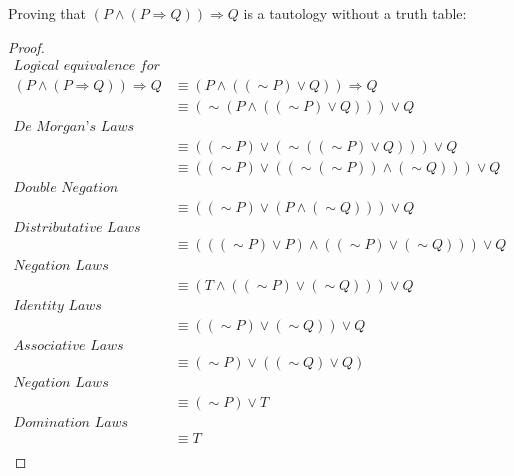\documentclass[12pt]{article}
\newenvironment{problem}[2][Problem]{\begin{trivlist}
		\item[\hskip \labelsep {\bfseries #1}\hskip \labelsep {\bfseries #2.}]}{\end{trivlist}}
\newenvironment{solution}[2][Solution]{\begin{trivlist}
		\item[\hskip \labelsep {\bfseries #1}\hskip \labelsep {\bfseries #2.}]}{\end{trivlist}}
\begin{document}
\begin{problem}{48}
\begin{solution}{}
	 \noindent Proving that $(P \wedge (P \Rightarrow Q)) \Rightarrow Q$ is a tautology without a truth table:\\
	 \begin{proof}
	 	\begin{align*}
	 		\textit{Logical equivalence for implication}\\
	 		(P \wedge (P \Rightarrow Q)) \Rightarrow Q & \equiv  (P \wedge ((\sim P)\vee Q)) \Rightarrow Q\\
	 		& \equiv (\sim (P \wedge ((\sim P)\vee Q)))\vee Q\\
	 		\textit{De Morgan's Laws}\\
	 		&\equiv ((\sim P) \vee (\sim((\sim P)\vee Q)))\vee Q\\
	 		&\equiv ((\sim P)\vee ((\sim (\sim P))\wedge (\sim Q))) \vee Q\\
	 		\textit{Double Negation}\\
	 		& \equiv ((\sim P) \vee (P \wedge (\sim Q))) \vee Q\\
	 		\textit{Distributative Laws}\\
	 		&\equiv (((\sim P)\vee P) \wedge ((\sim P)\vee (\sim Q))) \vee Q\\
	 		\textit{Negation Laws}\\
	 		&\equiv (T \wedge ((\sim P) \vee (\sim Q))) \vee Q\\
	 		\textit{Identity Laws}\\
	 		& \equiv ((\sim P) \vee (\sim Q)) \vee Q\\
	 		\textit{Associative Laws}\\
	 		& \equiv (\sim P) \vee ((\sim Q) \vee Q)\\
	 		\textit{Negation Laws}\\
	 		& \equiv (\sim P) \vee T\\
	 		\textit{Domination Laws}\\
	 		& \equiv T\\
	 	\end{align*}
	 \end{proof}
	\end{solution}
\end{problem}
\end{document}
